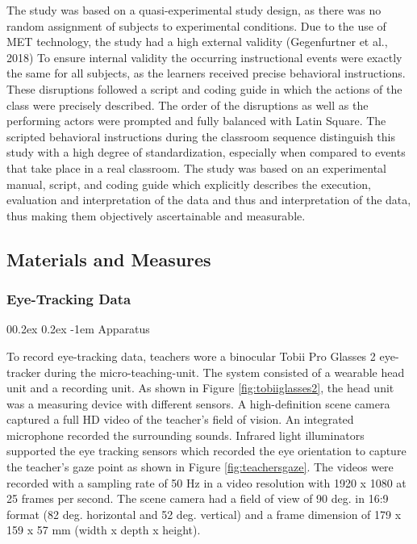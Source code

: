 \documentclass[
  man]{apa6}
\makeatletter
\let\oldparagraph\paragraph
\renewcommand{\paragraph}{
    \@ifstar
      \xxxParagraphStar
      \xxxParagraphNoStar
  }
\newcommand{\xxxParagraphStar}[1]{\oldparagraph*{#1}\mbox{}}
\newcommand{\xxxParagraphNoStar}[1]{\oldparagraph{#1}\mbox{}}
\renewcommand{\paragraph}{\@startsection{paragraph}{4}{\parindent}%
  {0\baselineskip \@plus 0.2ex \@minus 0.2ex}%
  {-1em}%
  {\normalfont\normalsize\bfseries\itshape\typesectitle}}
\makeatother
\begin{document}
The study was based on a quasi-experimental study design, as there was no random assignment of subjects to experimental conditions. Due to the use of MET technology, the study had a high external validity (Gegenfurtner et al., 2018) To ensure internal validity the occurring instructional events were exactly the same for all subjects, as the learners received precise behavioral instructions. These disruptions followed a script and coding guide in which the actions of the class were precisely described. The order of the disruptions as well as the performing actors were prompted and fully balanced with Latin Square. The scripted behavioral instructions during the classroom sequence distinguish this study with a high degree of standardization, especially when compared to events that take place in a real classroom. The study was based on an experimental manual, script, and coding guide which explicitly describes the execution, evaluation and interpretation of the data and thus and interpretation of the data, thus making them objectively ascertainable and measurable.

\subsection{Materials and Measures}\label{materials-and-measures}

\subsubsection{Eye-Tracking Data}\label{eye-tracking-data}

\paragraph{Apparatus}\label{apparatus}

To record eye-tracking data, teachers wore a binocular Tobii Pro Glasses 2 eye-tracker during the micro-teaching-unit. The system consisted of a wearable head unit and a recording unit. As shown in Figure \ref{fig:tobiiglasses2}, the head unit was a measuring device with different sensors. A high-definition scene camera captured a full HD video of the teacher's field of vision. An integrated microphone recorded the surrounding sounds. Infrared light illuminators supported the eye tracking sensors which recorded the eye orientation to capture the teacher's gaze point as shown in Figure \ref{fig:teachersgaze}. The videos were recorded with a sampling rate of 50 Hz in a video resolution with 1920 x 1080 at 25 frames per second. The scene camera had a field of view of 90 deg. in 16:9 format (82 deg. horizontal and 52 deg. vertical) and a frame dimension of 179 x 159 x 57 mm (width x depth x height).
\end{document}
